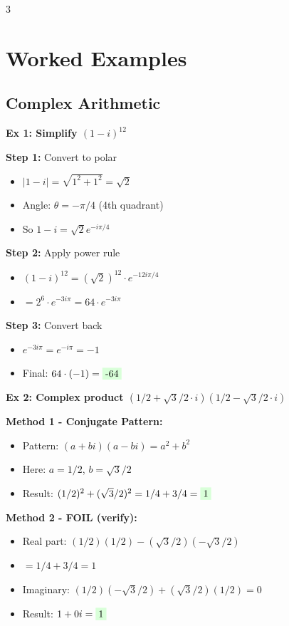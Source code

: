 \documentclass[10pt,landscape,a4paper]{article}
\newcommand{\problem}[1]{\textbf{\colorbox{cyan!15}{#1}}}
\newcommand{\answer}[1]{\colorbox{green!15}{#1}}
\begin{document}
\begin{multicols}{3}
\scriptsize

\section*{Worked Examples}

\subsection*{Complex Arithmetic}

\problem{Ex 1: Simplify $(1-i)^{12}$}

\textbf{Step 1:} Convert to polar
\begin{itemize}
\item $|1-i| = \sqrt{1^2 + 1^2} = \sqrt{2}$
\item Angle: $\theta = -\pi/4$ (4th quadrant)
\item So $1-i = \sqrt{2}e^{-i\pi/4}$
\end{itemize}

\textbf{Step 2:} Apply power rule
\begin{itemize}
\item $(1-i)^{12} = (\sqrt{2})^{12} \cdot e^{-12i\pi/4}$
\item $= 2^6 \cdot e^{-3i\pi} = 64 \cdot e^{-3i\pi}$
\end{itemize}

\textbf{Step 3:} Convert back
\begin{itemize}
\item $e^{-3i\pi} = e^{-i\pi} = -1$
\item Final: $64 \cdot (-1) = \answer{-64}$
\end{itemize}

\problem{Ex 2: Complex product $(1/2+\sqrt{3}/2\cdot i)(1/2-\sqrt{3}/2\cdot i)$}

\textbf{Method 1 - Conjugate Pattern:}
\begin{itemize}
\item Pattern: $(a+bi)(a-bi) = a^2 + b^2$
\item Here: $a = 1/2$, $b = \sqrt{3}/2$
\item Result: $(1/2)^2 + (\sqrt{3}/2)^2 = 1/4 + 3/4 = \answer{1}$
\end{itemize}

\textbf{Method 2 - FOIL (verify):}
\begin{itemize}
\item Real part: $(1/2)(1/2) - (\sqrt{3}/2)(-\sqrt{3}/2)$
\item $= 1/4 + 3/4 = 1$
\item Imaginary: $(1/2)(-\sqrt{3}/2) + (\sqrt{3}/2)(1/2) = 0$
\item Result: $1 + 0i = \answer{1}$
\end{itemize}


\end{multicols}
\end{document}
